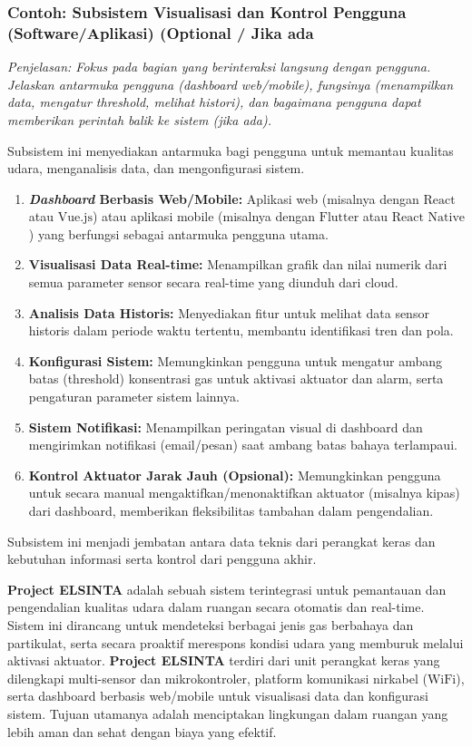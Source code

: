 \documentclass{elsinta}
\begin{document}
\subsubsection{Contoh: Subsistem Visualisasi dan Kontrol Pengguna (Software/Aplikasi) (Optional / Jika ada}
\textit{Penjelasan: Fokus pada bagian yang berinteraksi langsung dengan pengguna. Jelaskan antarmuka pengguna (\emph{dashboard} web/mobile), fungsinya (menampilkan data, mengatur threshold, melihat histori), dan bagaimana pengguna dapat memberikan perintah balik ke sistem (jika ada).}

Subsistem ini menyediakan antarmuka bagi pengguna untuk memantau kualitas udara, menganalisis data, dan mengonfigurasi sistem.
\begin{enumerate}
    \item \textbf{\emph{Dashboard} Berbasis Web/Mobile:} Aplikasi web (misalnya dengan $\text{React}$ atau $\text{Vue.js}$) atau aplikasi mobile (misalnya dengan $\text{Flutter}$ atau $\text{React Native}$) yang berfungsi sebagai antarmuka pengguna utama.
    \item \textbf{Visualisasi Data Real-time:} Menampilkan grafik dan nilai numerik dari semua parameter sensor secara real-time yang diunduh dari cloud.
    \item \textbf{Analisis Data Historis:} Menyediakan fitur untuk melihat data sensor historis dalam periode waktu tertentu, membantu identifikasi tren dan pola.
    \item \textbf{Konfigurasi Sistem:} Memungkinkan pengguna untuk mengatur ambang batas (threshold) konsentrasi gas untuk aktivasi aktuator dan alarm, serta pengaturan parameter sistem lainnya.
    \item \textbf{Sistem Notifikasi:} Menampilkan peringatan visual di dashboard dan mengirimkan notifikasi (email/pesan) saat ambang batas bahaya terlampaui.
    \item \textbf{Kontrol Aktuator Jarak Jauh (Opsional):} Memungkinkan pengguna untuk secara manual mengaktifkan/menonaktifkan aktuator (misalnya kipas) dari dashboard, memberikan fleksibilitas tambahan dalam pengendalian.
\end{enumerate}
Subsistem ini menjadi jembatan antara data teknis dari perangkat keras dan kebutuhan informasi serta kontrol dari pengguna akhir.

\textbf{Project ELSINTA} adalah sebuah sistem terintegrasi untuk pemantauan dan pengendalian kualitas udara dalam ruangan secara otomatis dan real-time. Sistem ini dirancang untuk mendeteksi berbagai jenis gas berbahaya dan partikulat, serta secara proaktif merespons kondisi udara yang memburuk melalui aktivasi aktuator. \textbf{Project ELSINTA} terdiri dari unit perangkat keras yang dilengkapi multi-sensor dan mikrokontroler, platform komunikasi nirkabel ($\text{WiFi}$), serta dashboard berbasis web/mobile untuk visualisasi data dan konfigurasi sistem. Tujuan utamanya adalah menciptakan lingkungan dalam ruangan yang lebih aman dan sehat dengan biaya yang efektif.
\end{document}

